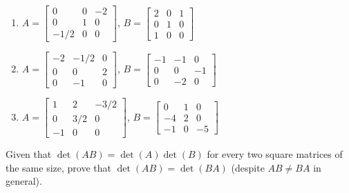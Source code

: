 \begin{exercise}
\begin{enumerate}
\item \(A=\begin{bmatrix} 0&0&-2
\\0&1&0
\\-1/2&0&0 \end{bmatrix}\), 
\(B=\begin{bmatrix} 2&0&1
\\0&1&0
\\1&0&0 \end{bmatrix}\)

\item \(A=\begin{bmatrix} -2&-1/2&0
\\0&0&2
\\0&-1&0 \end{bmatrix}\), 
\(B=\begin{bmatrix} -1&-1&0
\\0&0&-1
\\0&-2&0 \end{bmatrix}\)

\item \(A=\begin{bmatrix} 1&2&-3/2
\\0&3/2&0
\\-1&0&0 \end{bmatrix}\), 
\(B=\begin{bmatrix} 0&1&0
\\-4&2&0
\\-1&0&-5 \end{bmatrix}\)

\end{enumerate}
\end{exercise}




\begin{exercise} \label{ex:} 
Given that \(\det(AB)=\det(A)\det(B)\) for every two square matrices of the same size, prove that \(\det(AB)=\det(BA)\) (despite \(AB\neq BA\) in general).
\end{exercise}




